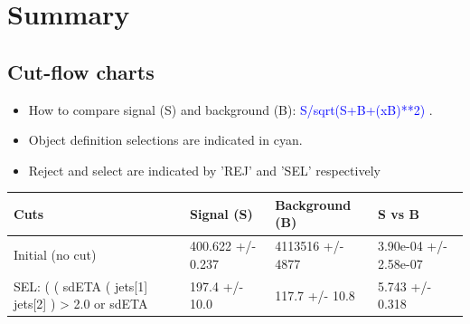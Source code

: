 \documentclass[a4paper, 10pt]{article}
\begin{document}
\section{ Summary}

\subsection{Cut-flow charts}

\begin{itemize}
  \item How to compare signal (S) and background (B): \textcolor{blue}{S/\-sqrt(S+B+(xB)**2)} .
   \item Object definition selections are indicated in cyan.  \item Reject and select are indicated by 'REJ' and 'SEL' respectively
\end{itemize}
\begin{table}[H]
  \begin{center}
    \begin{tabular}{|m{36.0mm}|m{36.0mm}|m{36.0mm}|m{33.0mm}|}
      \hline
      {\cellcolor{yellow}        Cuts}& {\cellcolor{yellow}         Signal (S)}& {\cellcolor{yellow}         Background (B)}& {\cellcolor{yellow}         S vs B}\\
      \hline
      {\cellcolor{white}         Initial (no cut)}& {\cellcolor{white}         400.622 +/\-- 0.237}& {\cellcolor{white}         4113516 +/\-- 4877}& {\cellcolor{white}         3.90e-04 +/\-- 2.58e-07}\\
      \hline
      {\cellcolor{white} SEL: ( ( sdETA ( jets[1] jets[2] ) > 2.0 or sdETA }& {\cellcolor{white}         197.4 +/\-- 10.0}& {\cellcolor{white}         117.7 +/\-- 10.8}& {\cellcolor{white}         5.743 +/\-- 0.318}\\
\hline
    \end{tabular}
  \end{center}
\end{table}
\end{document}
